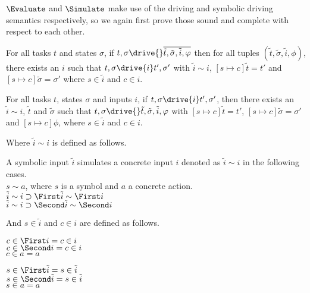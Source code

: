 $\Evaluate$ and $\Simulate$ make use of the driving and symbolic driving semantics respectively, so we again first prove those sound and complete with respect to each other.

\begin{lemma}
  \label{lem:sounddriving}
  For all tasks $t$ and states $\sigma$,
  if $t,\sigma\drive{} \overline{\tilde{t},\tilde{\sigma},\tilde{i},\phi}$
  then for all tuples $(\tilde{t},\tilde{\sigma},\tilde{i},\phi)$,
  there exists an $i$ such that
  $t,\sigma\drive{i}t',\sigma'$
  with $\tilde{i}\sim i$, $[s\mapsto c]\tilde{t}=t'$ and $[s\mapsto c]\tilde{\sigma}=\sigma'$ where $s\in \tilde{i}$ and $c\in i$.
\end{lemma}

\begin{lemma}
  \label{lem:completedriving}
  For all tasks $t$, states $\sigma$ and inputs $i$,
  if $t,\sigma\drive{i}t',\sigma'$,
  then there exists an $\tilde{i}\sim i$, $\tilde{t}$ and $\tilde{\sigma}$
  such that $t,\sigma\drive{}\tilde{t},\tilde{\sigma},\tilde{i},\phi$
  with $[s\mapsto c]\tilde{t}=t'$, $[s\mapsto c]\tilde{\sigma}=\sigma'$ and $[s\mapsto c]\phi$, where $s\in \tilde{i}$ and $c\in i$.
\end{lemma}

Where $\tilde{i}\sim i$ is defined as follows.

\begin{definition}
  A symbolic input $\tilde{i}$ simulates a concrete input $i$ denoted as $\tilde{i}\sim i$ in the following cases.\\
  $s\sim a$, where $s$ is a symbol and $a$ a concrete action.\\
  $\tilde{i}\sim i\implies \First \tilde{i} \sim \First i$\\
  $\tilde{i}\sim i\implies \Second \tilde{i} \sim \Second i$
\end{definition}

And $s\in \tilde{i}$ and $c\in i$ are defined as follows.

\begin{definition}
  $c\in \First i = c\in i $\\
  $c\in \Second i = c\in i $\\
  $c\in a = a $
\end{definition}

\begin{definition}
  $s\in \First \tilde{i} = s\in \tilde{i} $\\
  $s\in \Second \tilde{i} = s\in \tilde{i} $\\
  $s\in a = a $
\end{definition}


